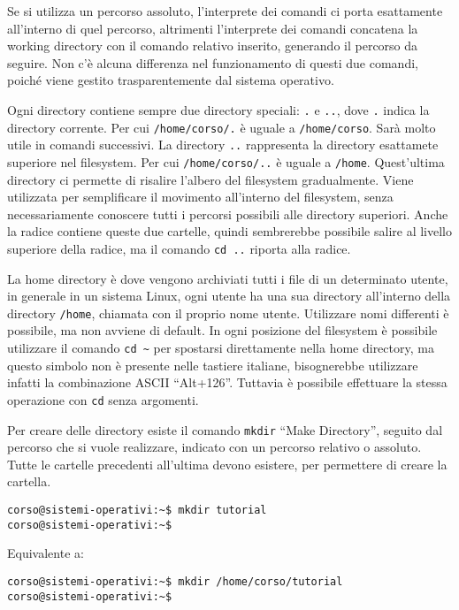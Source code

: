 \documentclass{article}
\numberwithin{equation}{subsection}
\begin{document}
Se si utilizza un percorso assoluto, l'interprete dei comandi ci porta esattamente all'interno di quel percorso, altrimenti l'interprete dei comandi concatena la working directory con il comando relativo inserito, 
generando il percorso da seguire. Non c'è alcuna differenza nel funzionamento di questi due comandi, poiché viene gestito trasparentemente dal sistema operativo. 

Ogni directory contiene sempre due directory speciali: \verb|.| e \verb|..|, dove \verb|.| indica la directory corrente. Per cui \verb|/home/corso/.| è uguale a \verb|/home/corso|. Sarà molto utile in comandi 
successivi. La directory \verb|..| rappresenta la directory esattamete superiore nel filesystem. Per cui \verb|/home/corso/..| è uguale a \verb|/home|. 
Quest'ultima directory ci permette di risalire l'albero del filesystem gradualmente. Viene utilizzata per semplificare il movimento all'interno del filesystem, senza necessariamente conoscere tutti i percorsi 
possibili alle directory superiori. Anche la radice contiene queste due cartelle, quindi sembrerebbe possibile salire al livello superiore della radice, ma il comando \verb|cd ..| riporta alla radice. 

La home directory è dove vengono archiviati tutti i file di un determinato utente, in generale in un sistema Linux, ogni utente ha una sua directory all'interno della directory \verb|/home|, chiamata con il proprio 
nome utente. Utilizzare nomi differenti è possibile, ma non avviene di default. In ogni posizione del filesystem è possibile utilizzare il comando \verb|cd ~| per spostarsi direttamente nella home directory, ma 
questo simbolo non è presente nelle tastiere italiane, bisognerebbe utilizzare infatti la combinazione ASCII ``Alt+126''. Tuttavia è possibile effettuare la stessa operazione con \verb|cd| senza argomenti. 

Per creare delle directory esiste il comando \verb|mkdir| ``Make Directory'', seguito dal percorso che si vuole realizzare, indicato con un percorso relativo o assoluto. Tutte le cartelle precedenti all'ultima 
devono esistere, per permettere di creare la cartella.  
\begin{verbatim}
corso@sistemi-operativi:~$ mkdir tutorial
corso@sistemi-operativi:~$
\end{verbatim}
Equivalente a: 
\begin{verbatim}
corso@sistemi-operativi:~$ mkdir /home/corso/tutorial
corso@sistemi-operativi:~$
\end{verbatim}
\end{document}
